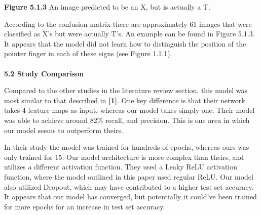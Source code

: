 \documentclass[11pt]{article}
\begin{document}
\begin{multicols}{2}
\begin{center}
\textbf{Figure 5.1.3} An image predicted to be an X, but is actually a T.
\end{center}
\par
According to the confusion matrix there are approximately 61 images that were classified as X's but were actually T's.  An example can be found in Figure 5.1.3.  It appears that the model did not learn how to distinguish the position of the pointer finger in each of these signs (see Figure 1.1.1). \\
\\
\textbf{5.2 Study Comparison}
\par
Compared to the other studies in the literature review section, this model was most similar to that described in \textbf{[1]}.  One key difference is that their network takes 4 feature maps as input, whereas our model takes simply one.  Their model was able to achieve around 82\% recall, and precision.  This is one area in which our model seems to outperform theirs.  
\par
In their study the model was trained for hundreds of epochs, whereas ours was only trained for 15.  Our model architecture is more complex than theirs, and utilizes a different activation function.  They used a Leaky ReLU activation function, where the model outlined in this paper used regular ReLU.  Our model also utilized Dropout, which may have contributed to a higher test set accuracy.  It appears that our model has converged, but potentially it could've been trained for more epochs for an increase in test set accuracy.

\end{multicols}
\end{document}
